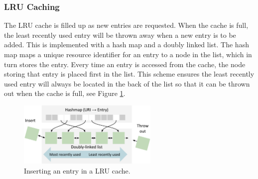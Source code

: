 \subsubsection{LRU Caching}
\label{section:lrucaching}
The LRU cache is filled up as new entries are requested. When the cache is full, the least recently used entry will be thrown away when a new entry is to be added. This is implemented with a hash map and a doubly linked list. The hash map maps a unique resource identifier for an entry to a node in the list, which in turn stores the entry. Every time an entry is accessed from the cache, the node storing that entry is placed first in the list. This scheme ensures the least recently used entry will always be located in the back of the list so that it can be thrown out when the cache is full, see Figure \ref{fig:lrucache}.

\begin{figure}[htbp]
    \centering
    \includegraphics[width=0.6\textwidth]{figures/lru_cache.pdf}
    \caption{Inserting an entry in a LRU cache.}
    \label{fig:lrucache}
\end{figure}